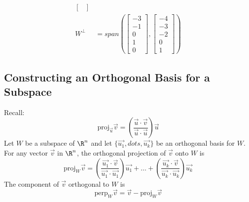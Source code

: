 \documentclass{math}
\begin{document}
\begin{align*}
\begin{bmatrix}
  \end{bmatrix} \\
  W^{\bot} &= span\left(\begin{bmatrix}
    -3 \\ -1 \\ 0 \\ 1 \\ 0
  \end{bmatrix},\begin{bmatrix}
    -4 \\ -3 \\ -2 \\ 0 \\ 1
  \end{bmatrix}\right)
\end{align*}

\subsection*{Constructing an Orthogonal Basis for a Subspace}
Recall:
\[ \text{proj}_{\vec{u}}\vec{v} =
  \left(\frac{\vec{u}\cdot\vec{v}}{\vec{u}\cdot\vec{u}}\right)\vec{u} \]
Let \( W \) be a subspace of \( \R^n \) and let
\( \{\vec{u_1},dots,\vec{u_k}\} \) be an orthogonal basis for \( W \). For any
vector \( \vec{v} \) in \( \R^n \), the orthogonal projection of \( \vec{v} \)
onto \( W \) is
\[ \text{proj}_{W}\vec{v} =
  \left(\frac{\vec{u_1}\cdot\vec{v}}{\vec{u_1}\cdot\vec{u_1}}\right)\vec{u_1}+
  \dots+
  \left(\frac{\vec{u_k}\cdot\vec{v}}{\vec{u_k}\cdot\vec{u_k}}\right)\vec{u_k} \]
The component of \( \vec{v} \) orthogonal to \( W \) is
\[ \text{perp}_{W}\vec{v} = \vec{v}-\text{proj}_{W}\vec{v} \]
\end{document}
